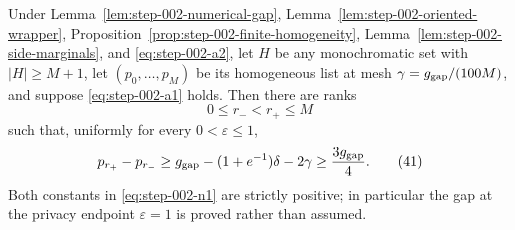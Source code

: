 \begin{proposition}
\label{prop:step-002-endpoint-gap}

Under Lemma~\ref{lem:step-002-numerical-gap}, Lemma~\ref{lem:step-002-oriented-wrapper}, Proposition~\ref{prop:step-002-finite-homogeneity}, Lemma~\ref{lem:step-002-side-marginals}, and \eqref{eq:step-002-a2}, let \(H\) be any monochromatic set with \(|H|\ge M+1\), let \((p_0,\ldots,p_M)\) be its homogeneous list at mesh \(\gamma=g_{\rm gap}/(100M)\), and suppose \eqref{eq:step-002-a1} holds. Then there are ranks
\[
0\le r_-<r_+\le M
\tag{40}\label{eq:step-002-40}
\]
such that, uniformly for every \(0<\varepsilon\le 1\),
\[
p_{r_+}-p_{r_-}
\ge g_{\rm gap}-(1+e^{-1})\delta-2\gamma
\ge\frac{3g_{\rm gap}}4.
\tag{41}\label{eq:step-002-41}
\]
Both constants in \eqref{eq:step-002-n1} are strictly positive; in particular the gap at the privacy endpoint \(\varepsilon=1\) is proved rather than assumed.

\end{proposition}

